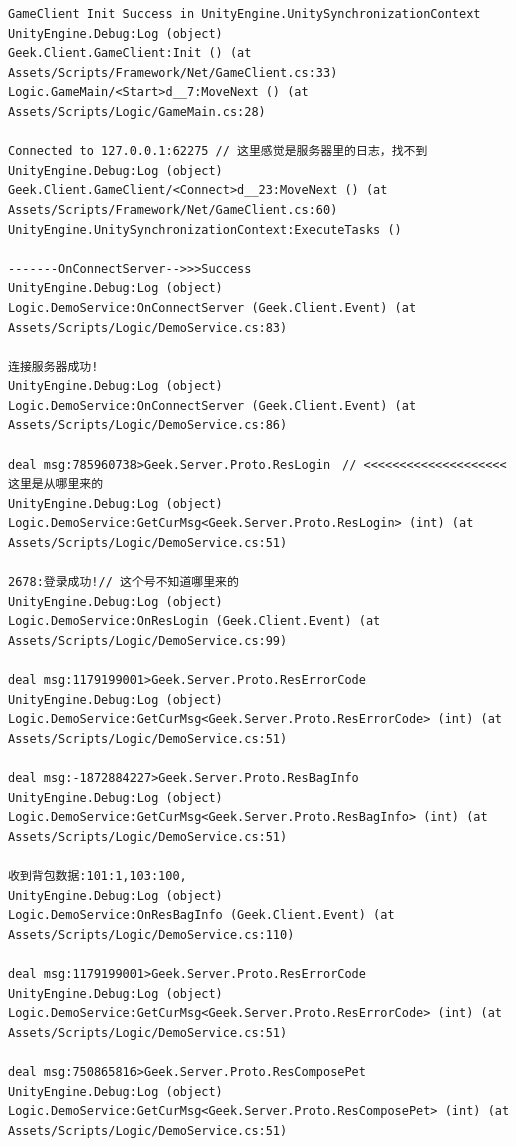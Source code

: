 \documentclass[9pt, b5paper]{article}
\begin{document}
\begin{verbatim}
GameClient Init Success in UnityEngine.UnitySynchronizationContext
UnityEngine.Debug:Log (object)
Geek.Client.GameClient:Init () (at Assets/Scripts/Framework/Net/GameClient.cs:33)
Logic.GameMain/<Start>d__7:MoveNext () (at Assets/Scripts/Logic/GameMain.cs:28)

Connected to 127.0.0.1:62275 // 这里感觉是服务器里的日志，找不到
UnityEngine.Debug:Log (object)
Geek.Client.GameClient/<Connect>d__23:MoveNext () (at Assets/Scripts/Framework/Net/GameClient.cs:60)
UnityEngine.UnitySynchronizationContext:ExecuteTasks ()

-------OnConnectServer-->>>Success
UnityEngine.Debug:Log (object)
Logic.DemoService:OnConnectServer (Geek.Client.Event) (at Assets/Scripts/Logic/DemoService.cs:83)

连接服务器成功!
UnityEngine.Debug:Log (object)
Logic.DemoService:OnConnectServer (Geek.Client.Event) (at Assets/Scripts/Logic/DemoService.cs:86)

deal msg:785960738>Geek.Server.Proto.ResLogin　// <<<<<<<<<<<<<<<<<<<< 这里是从哪里来的 
UnityEngine.Debug:Log (object)
Logic.DemoService:GetCurMsg<Geek.Server.Proto.ResLogin> (int) (at Assets/Scripts/Logic/DemoService.cs:51)

2678:登录成功!// 这个号不知道哪里来的
UnityEngine.Debug:Log (object)
Logic.DemoService:OnResLogin (Geek.Client.Event) (at Assets/Scripts/Logic/DemoService.cs:99)

deal msg:1179199001>Geek.Server.Proto.ResErrorCode
UnityEngine.Debug:Log (object)
Logic.DemoService:GetCurMsg<Geek.Server.Proto.ResErrorCode> (int) (at Assets/Scripts/Logic/DemoService.cs:51)

deal msg:-1872884227>Geek.Server.Proto.ResBagInfo
UnityEngine.Debug:Log (object)
Logic.DemoService:GetCurMsg<Geek.Server.Proto.ResBagInfo> (int) (at Assets/Scripts/Logic/DemoService.cs:51)

收到背包数据:101:1,103:100,
UnityEngine.Debug:Log (object)
Logic.DemoService:OnResBagInfo (Geek.Client.Event) (at Assets/Scripts/Logic/DemoService.cs:110)

deal msg:1179199001>Geek.Server.Proto.ResErrorCode
UnityEngine.Debug:Log (object)
Logic.DemoService:GetCurMsg<Geek.Server.Proto.ResErrorCode> (int) (at Assets/Scripts/Logic/DemoService.cs:51)

deal msg:750865816>Geek.Server.Proto.ResComposePet
UnityEngine.Debug:Log (object)
Logic.DemoService:GetCurMsg<Geek.Server.Proto.ResComposePet> (int) (at Assets/Scripts/Logic/DemoService.cs:51)


\end{verbatim}
\end{document}
